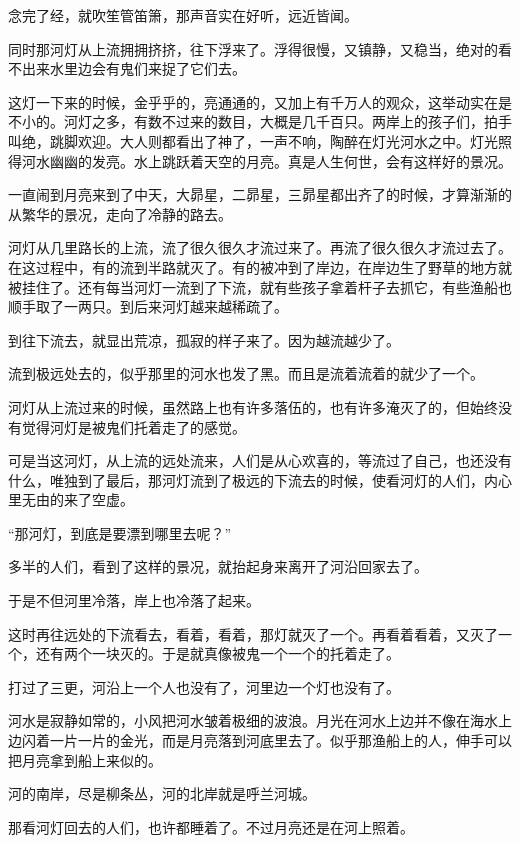 \par 念完了经，就吹笙管笛箫，那声音实在好听，远近皆闻。
\par 同时那河灯从上流拥拥挤挤，往下浮来了。浮得很慢，又镇静，又稳当，绝对的看不出来水里边会有鬼们来捉了它们去。
\par 这灯一下来的时候，金乎乎的，亮通通的，又加上有千万人的观众，这举动实在是不小的。河灯之多，有数不过来的数目，大概是几千百只。两岸上的孩子们，拍手叫绝，跳脚欢迎。大人则都看出了神了，一声不响，陶醉在灯光河水之中。灯光照得河水幽幽的发亮。水上跳跃着天空的月亮。真是人生何世，会有这样好的景况。
\par 一直闹到月亮来到了中天，大昴星，二昴星，三昴星都出齐了的时候，才算渐渐的从繁华的景况，走向了冷静的路去。
\par 河灯从几里路长的上流，流了很久很久才流过来了。再流了很久很久才流过去了。在这过程中，有的流到半路就灭了。有的被冲到了岸边，在岸边生了野草的地方就被挂住了。还有每当河灯一流到了下流，就有些孩子拿着杆子去抓它，有些渔船也顺手取了一两只。到后来河灯越来越稀疏了。
\par 到往下流去，就显出荒凉，孤寂的样子来了。因为越流越少了。
\par 流到极远处去的，似乎那里的河水也发了黑。而且是流着流着的就少了一个。
\par 河灯从上流过来的时候，虽然路上也有许多落伍的，也有许多淹灭了的，但始终没有觉得河灯是被鬼们托着走了的感觉。
\par 可是当这河灯，从上流的远处流来，人们是从心欢喜的，等流过了自己，也还没有什么，唯独到了最后，那河灯流到了极远的下流去的时候，使看河灯的人们，内心里无由的来了空虚。
\par “那河灯，到底是要漂到哪里去呢？”
\par 多半的人们，看到了这样的景况，就抬起身来离开了河沿回家去了。
\par 于是不但河里冷落，岸上也冷落了起来。
\par 这时再往远处的下流看去，看着，看着，那灯就灭了一个。再看着看着，又灭了一个，还有两个一块灭的。于是就真像被鬼一个一个的托着走了。
\par 打过了三更，河沿上一个人也没有了，河里边一个灯也没有了。
\par 河水是寂静如常的，小风把河水皱着极细的波浪。月光在河水上边并不像在海水上边闪着一片一片的金光，而是月亮落到河底里去了。似乎那渔船上的人，伸手可以把月亮拿到船上来似的。
\par 河的南岸，尽是柳条丛，河的北岸就是呼兰河城。
\par 那看河灯回去的人们，也许都睡着了。不过月亮还是在河上照着。
